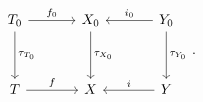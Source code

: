 \[
\begin{tikzcd}[column sep=3.4em, row sep=3.4em]
 T_0 \arrow[r,"f_0"] \arrow[d,"\tau_{T_0}"]
 &
 X_0 \arrow[d,"\tau_{X_0}"]
 &
 Y_0 \arrow[l,"i_0"'] \arrow[d,"\tau_{Y_0}"]
 \\
 T \arrow[r,"f"]
 &
 X
 &
 Y \arrow[l,"i"']
\end{tikzcd}
\, .
\]
